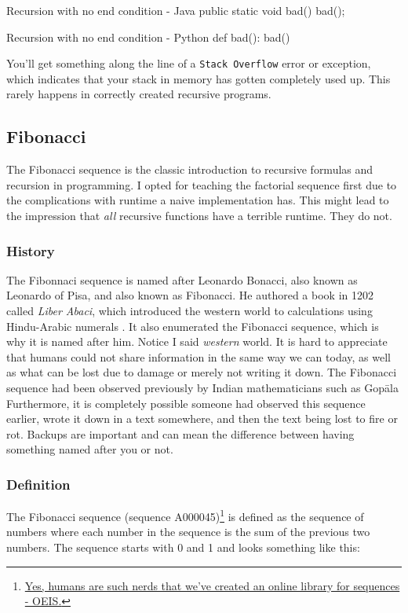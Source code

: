 \begin{javacode}{Recursion with no end condition - Java}
public static void bad(){
	bad();
}
\end{javacode}


\begin{pycode}{Recursion with no end condition - Python}
def bad():
	bad()
\end{pycode}

You'll get something along the line of a \texttt{Stack Overflow} error or exception, which indicates that your stack in memory has gotten completely used up.  This rarely happens in correctly created recursive programs.

\subsection{Fibonacci}

The Fibonacci sequence is the classic introduction to recursive formulas and recursion in programming.  I opted for teaching the factorial sequence first due to the complications with runtime a naive implementation has.  This might lead to the impression that \textit{all} recursive functions have a terrible runtime.  They do not.  





\subsubsection{History}
The Fibonnaci sequence is named after Leonardo Bonacci, also known as Leonardo of Pisa, and also known as Fibonacci.  He authored a book in 1202 called \textit{Liber Abaci}, which introduced the western world to calculations using Hindu-Arabic numerals .  It also enumerated the Fibonacci sequence, which is why it is named after him\cite{Bonacci1202,sigler2002fibonacci}.   Notice I said \textit{western} world.  It is hard to appreciate that humans could not share information in the same way we can today, as well as what can be lost due to damage or merely not writing it down.   The Fibonacci sequence had been observed previously by Indian mathematicians such as Gop\={a}la  \cite{singh1985fib}
Furthermore, it is completely possible someone had observed this sequence earlier, wrote it down in a text somewhere, and then the text being lost to fire or rot.  Backups are important and can mean the difference between having something named after you or not.

\subsubsection{Definition}
The Fibonacci sequence  (sequence A000045)\footnote{\href{https://oeis.org/}{Yes, humans are such nerds that we've created an online library for sequences - OEIS.}} is defined as the sequence of numbers where each number in the sequence is the sum of the previous two numbers.  The sequence starts with 0 and 1  and looks something like this:

